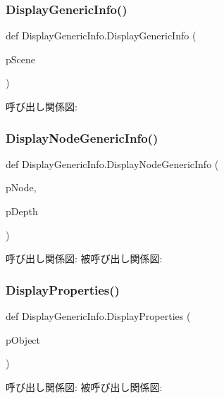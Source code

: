 \subsubsection{\texorpdfstring{Display\+Generic\+Info()}{DisplayGenericInfo()}}
{\footnotesize\ttfamily def Display\+Generic\+Info.\+Display\+Generic\+Info (\begin{DoxyParamCaption}\item[{}]{p\+Scene }\end{DoxyParamCaption})}

呼び出し関係図\+:
\mbox{\label{namespace_display_generic_info_abb5d03bf361368bbe20b440e69bfaf99}} 
\subsubsection{\texorpdfstring{Display\+Node\+Generic\+Info()}{DisplayNodeGenericInfo()}}
{\footnotesize\ttfamily def Display\+Generic\+Info.\+Display\+Node\+Generic\+Info (\begin{DoxyParamCaption}\item[{}]{p\+Node,  }\item[{}]{p\+Depth }\end{DoxyParamCaption})}

呼び出し関係図\+:
被呼び出し関係図\+:
\mbox{\label{namespace_display_generic_info_a5df606a5fc66507df9713e52a7fc5fa2}} 
\subsubsection{\texorpdfstring{Display\+Properties()}{DisplayProperties()}}
{\footnotesize\ttfamily def Display\+Generic\+Info.\+Display\+Properties (\begin{DoxyParamCaption}\item[{}]{p\+Object }\end{DoxyParamCaption})}

呼び出し関係図\+:
被呼び出し関係図\+:
